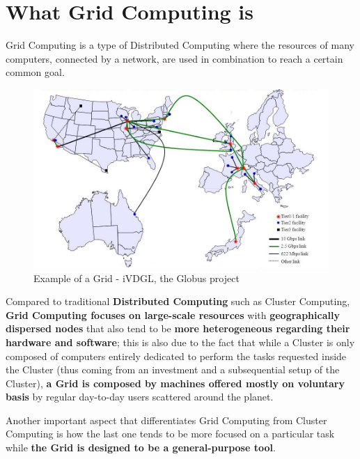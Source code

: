 \section{What Grid Computing is}
Grid Computing is a type of Distributed Computing where the resources of many computers, connected by a network, are used in combination to reach a certain common goal.

\begin{figure}[!ht]
    \centering
    \includegraphics[scale=0.46]{document/chapters/chapter_1/images/iVDGL_globus.jpg}
    \caption{Example of a Grid - iVDGL, the Globus project \cite{iVDGL}}
    \label{fig:iVDGL}
\end{figure}

Compared to traditional \textbf{Distributed Computing} such as Cluster Computing, \textbf{Grid Computing focuses on large-scale resources} with \textbf{geographically dispersed nodes} that also tend to be \textbf{more heterogeneous regarding their hardware and software}; this is also due to the fact that while a Cluster is only composed of computers entirely dedicated to perform the tasks requested inside the Cluster (thus coming from an investment and a subsequential setup of the Cluster), \textbf{a Grid is composed by machines offered mostly on voluntary basis} by regular day-to-day users scattered around the planet.

Another important aspect that differentiates Grid Computing from Cluster Computing is how the last one tends to be more focused on a particular task while \textbf{the Grid is designed to be a general-purpose tool}.

